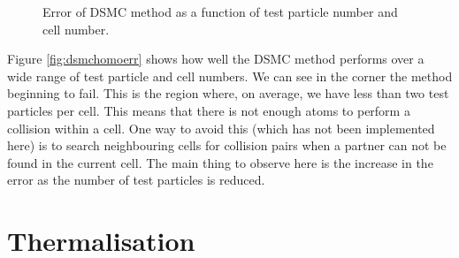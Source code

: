 \begin{figure}[bth]
\myfloatalign
{} \quad
{}
\caption[]{Error of DSMC method as a function of test particle number and cell number.}\label{fig:dsmccolerr}
\end{figure}

Figure \ref{fig:dsmchomoerr} shows how well the DSMC method performs over a wide range of test particle and cell numbers. 
We can see in the corner the method beginning to fail. 
This is the region where, on average, we have less than two test particles per cell. 
This means that there is not enough atoms to perform a collision within a cell. 
One way to avoid this (which has not been implemented here) is to search neighbouring cells for collision pairs when a partner can not be found in the current cell.
The main thing to observe here is the increase in the error as the number of test particles is reduced.


\section{Thermalisation}

